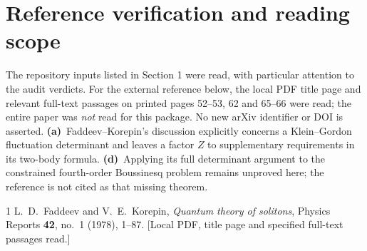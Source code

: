 \documentclass[11pt,a4paper]{article}
\newcommand{\Ca}{\textbf{(a)}\ }
\newcommand{\Cd}{\textbf{(d)}\ }
\begin{document}
\clearpage
\section*{Reference verification and reading scope}
The repository inputs listed in Section 1 were read, with particular
attention to the audit verdicts. For the external reference below, the
local PDF title page and relevant full-text passages on printed pages
52--53, 62 and 65--66 were read; the entire paper was \emph{not} read
for this package. No new arXiv identifier or DOI is asserted.
\Ca Faddeev--Korepin's discussion explicitly concerns a Klein--Gordon
fluctuation determinant and leaves a factor \(Z\) to supplementary
requirements in its two-body formula. \Cd Applying its full determinant
argument to the constrained fourth-order Boussinesq problem remains
unproved here; the reference is not cited as that missing theorem.

\begin{thebibliography}{1}
 L.~D.~Faddeev and V.~E.~Korepin,
\emph{Quantum theory of solitons}, Physics Reports \textbf{42}, no.~1
(1978), 1--87. [Local PDF, title page and specified full-text passages read.]
\end{thebibliography}
\end{document}
